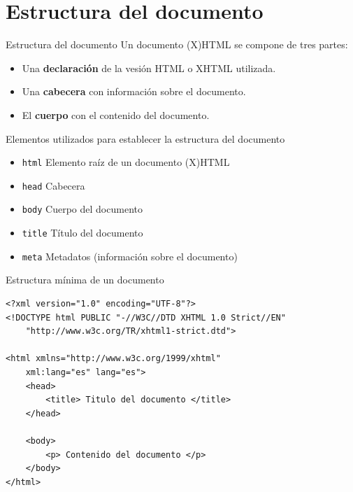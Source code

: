 \documentclass{beamer}
\begin{document}
\section{Estructura del documento} %
\label{sec:Estructura del documento}

\begin{frame}{Estructura del documento} %
    Un documento (X)HTML se compone de tres partes: 

    \begin{itemize}
        \item Una \textbf{declaración} de la vesión HTML o XHTML utilizada. 
        \item Una \textbf{cabecera} con información sobre el documento.
        \item El  \textbf{cuerpo} con el contenido del documento.
    \end{itemize}
\end{frame}

\begin{frame}{Elementos utilizados para establecer la estructura del documento} %
    \begin{center}
        \begin{itemize}
            \item \texttt{html} Elemento raíz de un documento (X)HTML
            \item \texttt{head} Cabecera
            \item \texttt{body} Cuerpo del documento
            \item \texttt{title} Título del documento
            \item \texttt{meta} Metadatos (información sobre el documento)
        \end{itemize}
    \end{center}
\end{frame}

\begin{frame}[fragile]{Estructura mínima de un documento} %
    \begin{lstlisting}    
<?xml version="1.0" encoding="UTF-8"?>
<!DOCTYPE html PUBLIC "-//W3C//DTD XHTML 1.0 Strict//EN"
    "http://www.w3c.org/TR/xhtml1-strict.dtd">

<html xmlns="http://www.w3c.org/1999/xhtml" 
    xml:lang="es" lang="es"> 
    <head>
        <title> Titulo del documento </title>
    </head>

    <body>
        <p> Contenido del documento </p>
    </body>
</html>
    \end{lstlisting}
\end{frame}
\end{document}

